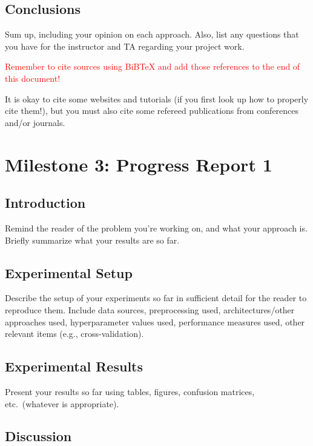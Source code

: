 \documentclass{report}
\begin{document}
\section{Conclusions}

Sum up, including your opinion on each approach.  Also, list any questions that you have for the instructor and TA regarding your project work.

\textcolor{red}{Remember to cite sources using BiBTeX and add those references to the end of this document!}

It is okay to cite some websites and tutorials (if you first look up how to properly cite them!), but you must also cite some refereed publications from conferences and/or journals.

\chapter{Milestone 3: Progress Report 1}

\section{Introduction}
\label{sec:M3-intro}

Remind the reader of the problem you're working on, and what your approach is.  Briefly summarize what your results are so far.

\section{Experimental Setup}
\label{sec:M3-setup}

Describe the setup of your experiments so far in sufficient detail for the reader to reproduce them.  Include data sources, preprocessing used, architectures/other approaches used, hyperparameter values used, performance measures used, other relevant items (e.g., cross-validation).

\section{Experimental Results}
\label{sec:M3-results}

Present your results so far using tables, figures, confusion matrices, etc.\ (whatever is appropriate). 

\section{Discussion}
\end{document}
